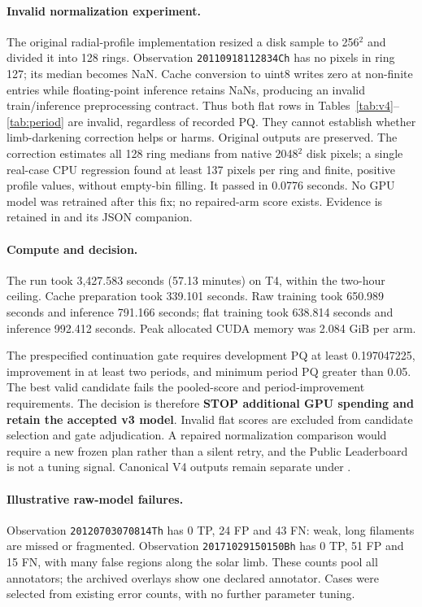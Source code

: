 \documentclass[sigconf]{acmart}
\begin{document}
\paragraph{Invalid normalization experiment.}
The original radial-profile implementation resized a disk sample to 256$^2$ and divided it into 128 rings. Observation \texttt{20110918112834Ch} has no pixels in ring 127; its median becomes NaN. Cache conversion to uint8 writes zero at non-finite entries while floating-point inference retains NaNs, producing an invalid train/inference preprocessing contract. Thus both flat rows in Tables~\ref{tab:v4}--\ref{tab:period} are invalid, regardless of recorded PQ. They cannot establish whether limb-darkening correction helps or harms. Original outputs are preserved. The correction estimates all 128 ring medians from native 2048$^2$ disk pixels; a single real-case CPU regression found at least 137 pixels per ring and finite, positive profile values, without empty-bin filling. It passed in 0.0776 seconds. No GPU model was retrained after this fix; no repaired-arm score exists. Evidence is retained in  and its JSON companion.

\paragraph{Compute and decision.}
The run took 3,427.583 seconds (57.13 minutes) on T4, within the two-hour ceiling. Cache preparation took 339.101 seconds. Raw training took 650.989 seconds and inference 791.166 seconds; flat training took 638.814 seconds and inference 992.412 seconds. Peak allocated CUDA memory was 2.084 GiB per arm.

The prespecified continuation gate requires development PQ at least 0.197047225, improvement in at least two periods, and minimum period PQ greater than 0.05. The best valid candidate fails the pooled-score and period-improvement requirements. The decision is therefore \textbf{STOP additional GPU spending and retain the accepted v3 model}. Invalid flat scores are excluded from candidate selection and gate adjudication. A repaired normalization comparison would require a new frozen plan rather than a silent retry, and the Public Leaderboard is not a tuning signal. Canonical V4 outputs remain separate under .

\paragraph{Illustrative raw-model failures.}
Observation \texttt{20120703070814Th} has 0 TP, 24 FP and 43 FN: weak, long filaments are missed or fragmented. Observation \texttt{20171029150150Bh} has 0 TP, 51 FP and 15 FN, with many false regions along the solar limb. These counts pool all annotators; the archived overlays show one declared annotator. Cases were selected from existing error counts, with no further parameter tuning.
\end{document}
